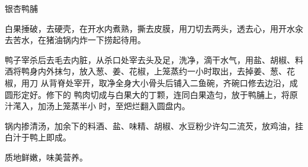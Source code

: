 %
%
%
%
%
%
%
\begin{recipe}{银杏鸭脯}

\ingredients


\preparation

\step 白果捶破，去硬壳，在开水内煮熟，撕去皮膜，用刀切去两头，透去心，用开水汆
去苦水，在猪油锅内炸一下捞起待用。

\step 鸭子宰杀后去毛去内脏，从杀口处宰去头及足，洗净，滴干水气，用盐、胡椒、料
酒将鸭身内外抹匀，放入葱、姜、花椒，上笼蒸约一小时取出，去掉姜、葱、花椒，用刀
从背脊处宰开，取净全身大小骨头后铺入二鱼碗，齐碗口修去边沿，成圆形定好。修下的
鸭肉切成与白果大的丁颗，连同白果造匀，放于鸭脯上，将原汁滗入，加汤上笼蒸半小
时，至𤆵烂翻入圆盘内。

\step 锅内掺清汤，加余下的料酒、盐、味精、胡椒、水豆粉少许勾二流芡，放鸡油，挂
白汁于鸭上即成。

\features

质地鲜嫩，味美营养。

\end{recipe}

